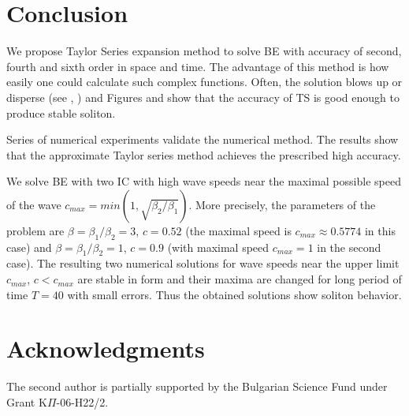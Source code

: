\documentclass[11pt,a4paper,twoside]{article}
\begin{document}
\section{Conclusion}\label{Concl}

We propose Taylor Series expansion method to solve BE with accuracy of second, fourth and sixth order in space and time. The advantage of this method is how easily one could calculate such complex functions. Often, the solution blows up or disperse (see \cite{cher}, \cite{dani}) and Figures  and  show that the accuracy of TS is good enough to produce stable soliton.

Series of numerical experiments validate the numerical method. The results show that the approximate Taylor series method achieves the prescribed high accuracy. 

We solve BE  with two IC with high wave speeds near the maximal possible speed of the wave $c_{max}= min(1, \sqrt{\beta_2/{\beta_1}})$. More precisely, the parameters of the problem are $\beta =\beta_1/{\beta_2}= 3$, $c = 0.52$ (the maximal speed  is $c_{max} \approx 0.5774$  in this case) 
and $\beta =\beta_1/{\beta_2}= 1$, $c=0.9$ (with maximal speed $c_{max} = 1$ in the second case). 
The resulting two numerical solutions for wave speeds near the upper limit $c_{max} $, $c < c_{max}$ are stable in form and  their maxima are changed for long period of time $T=40$ with small errors.  Thus the obtained solutions show soliton behavior. 

\section{Acknowledgments}

The second author is  partially supported by  the Bulgarian Science Fund under Grant K$\Pi$-06-H22/2.


\end{document}
